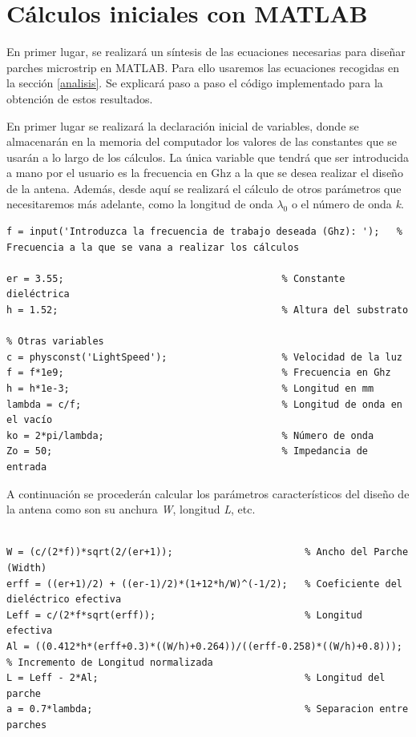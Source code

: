 \section{Cálculos iniciales con MATLAB}
\par En primer lugar, se realizará un síntesis de las ecuaciones necesarias para diseñar parches microstrip en MATLAB. Para ello usaremos las ecuaciones recogidas en la sección \ref{analisis}. Se explicará paso a paso el código implementado para la obtención de estos resultados.
\\
\par En primer lugar se realizará la declaración inicial de variables, donde se almacenarán en la memoria del computador los valores de las constantes que se usarán a lo largo de los cálculos. La única variable que tendrá que ser introducida a mano por el usuario es la frecuencia en Ghz a la que se desea realizar el diseño de la antena. Además, desde aquí se realizará el cálculo de otros parámetros que necesitaremos más adelante, como la longitud de onda \textit{$\lambda_{0}$} o el número de onda \textit{k}.

\begin{lstlisting}[style=Matlab-color, caption={Declaración de variables iniciales},label=variniciales]
%% Input Variables
f = input('Introduzca la frecuencia de trabajo deseada (Ghz): ');   % Frecuencia a la que se vana a realizar los cálculos

er = 3.55;										% Constante dieléctrica
h = 1.52;										% Altura del substrato

% Otras variables
c = physconst('LightSpeed');					% Velocidad de la luz
f = f*1e9;										% Frecuencia en Ghz
h = h*1e-3;										% Longitud en mm
lambda = c/f;									% Longitud de onda en el vacío
ko = 2*pi/lambda;								% Número de onda
Zo = 50;										% Impedancia de entrada
\end{lstlisting}

\par A continuación se procederán calcular los parámetros característicos del diseño de la antena como son su anchura \textit{W}, longitud \textit{L}, etc. 

\begin{lstlisting}[style=Matlab-color, caption={Parámetros de diseño de la antena},label=diseñoantena]
%% Cálculos del Parche

W = (c/(2*f))*sqrt(2/(er+1));                       % Ancho del Parche (Width)
erff = ((er+1)/2) + ((er-1)/2)*(1+12*h/W)^(-1/2);   % Coeficiente del dieléctrico efectiva
Leff = c/(2*f*sqrt(erff));                          % Longitud efectiva
Al = ((0.412*h*(erff+0.3)*((W/h)+0.264))/((erff-0.258)*((W/h)+0.8))); % Incremento de Longitud normalizada
L = Leff - 2*Al;                                    % Longitud del parche
a = 0.7*lambda;                                     % Separacion entre parches
\end{lstlisting}

